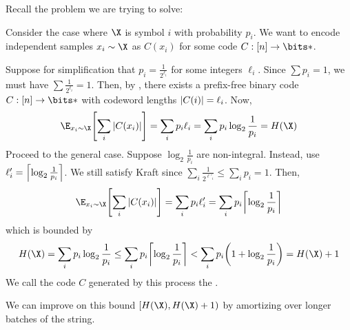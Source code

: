 \documentclass[class=co432,notes,tikz]{agony}
\begin{document}
Recall the problem we are trying to solve:
\bitproblem*
\begin{sol}
  Consider the case where $\X$ is symbol $i$ with probability $p_i$.
  We want to encode independent samples $x_i \sim \X$
  as $C(x_i)$ for some code $C : [n] \to \bits*$.

  Suppose for simplification that $p_i = \frac{1}{2^{\ell_i}}$
  for some integers $\ell_i$.
  Since $\sum p_i = 1$, we must have $\sum \frac{1}{2^{\ell_i}} = 1$.
  Then, by , there exists a prefix-free binary code
  $C : [n] \to \bits*$ with codeword lengths $\abs{C(i)} = \ell_i$.
  Now,
  \[
    \E_{x_i \sim \X}\qty[\sum_i\abs{C(x_i)}] = \sum_i p_i\ell_i = \sum_i p_i\log_2\frac{1}{p_i} = H(\X)
  \]
  Proceed to the general case.
  Suppose $\log_2\frac{1}{p_i}$ are non-integral.
  Instead, use $\ell'_i = \ceil*{\log_2\frac{1}{p_i}}$.
  We still satisfy Kraft since $\sum_i \frac{1}{2^{\ell'_i}} \leq \sum_i p_i = 1$.
  Then,
  \[
    \E_{x_i \sim \X}\qty[\sum_i\abs{C(x_i)}] = \sum_i p_i\ell'_i = \sum_i p_i\ceil*{\log_2\frac{1}{p_i}}
  \]
  which is bounded by
  \[ H(\X) = \sum_i p_i\log_2\frac{1}{p_i} \leq \sum_i p_i\ceil*{\log_2\frac{1}{p_i}} < \sum_i p_i\qty(1+\log_2\frac{1}{p_i}) = H(\X) + 1 \]
  We call the code $C$ generated by this process the .
\end{sol}

We can improve on this bound $[H(\X), H(\X) + 1)$
by amortizing over longer batches of the string.
\end{document}
